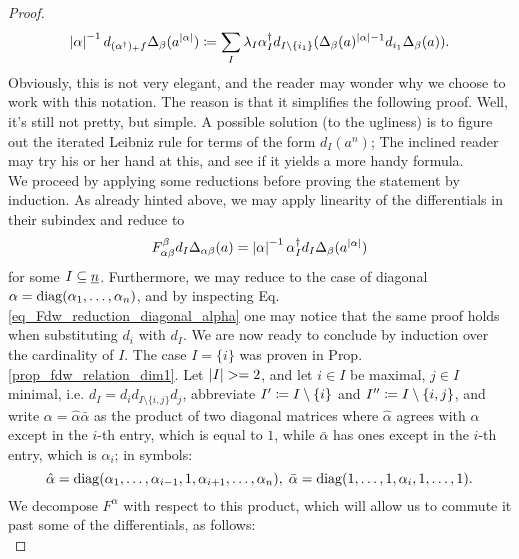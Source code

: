 \begin{cor}
\begin{proof}
\begin{equation*}
    \abs{\alpha}^{-1} d_{(\alpha^\dagger)_+ f} \Delta_{\beta}(a^{\abs{\alpha}}) \defas %
    \sum_I \lambda_I \alpha^\dagger_I d_{I \setminus \{i_1\}}
      (\Delta_{\beta}(a)^{\abs{\alpha}-1} d_{i_1} \Delta_{\beta}(a)).
  \end{equation*}
  Obviously, this is not very elegant, and the reader may wonder why we choose to work with this notation. The reason is that it simplifies the following proof. Well, it's still not pretty, but simple. A possible solution (to the ugliness) is to figure out the iterated Leibniz rule for terms of the form $d_I (a^n)$; The inclined reader may try his or her hand at this, and see if it yields a more handy formula. \\
  We proceed by applying some reductions before proving the statement by induction. As already hinted above, we may apply linearity of the differentials in their subindex and reduce to
  \begin{equation*}
    F_{\alpha\beta}^\beta d_I \Delta_{\alpha\beta} (a) =%
    \abs{\alpha}^{-1}\alpha^\dagger_I d_I \Delta_{\beta}(a^{\abs{\alpha}})%
  \end{equation*}
  for some $I \subseteq \underline{n}$. Furthermore, we may reduce to the case of diagonal $\alpha = \mathrm{diag}(\alpha_1, \ldots, \alpha_n)$, and by inspecting Eq. \ref{eq_Fdw_reduction_diagonal_alpha} one may notice that the same proof holds when substituting $d_i$ with $d_I$. We are now ready to conclude by induction over the cardinality of $I$. The case $I = \{i\}$ was proven in Prop. \ref{prop_fdw_relation_dim1}. Let $\left\vert I\right\vert >= 2$, and let $i \in I$ be maximal, $j\in I$ minimal, i.e. $d_I = d_i d_{I \setminus \{i,j\}} d_j$, abbreviate $I^\prime \coloneqq I \setminus \{i\}$ and $I^{\prime\prime} \coloneqq I \setminus \{i,j\}$, and write $\alpha = \hat \alpha \bar \alpha$ as the product of two diagonal matrices where $\hat \alpha$ agrees with $\alpha$ except in the $i$-th entry, which is equal to $1$, while $\bar \alpha$ has ones except in the $i$-th entry, which is $\alpha_i$; in symbols:
  \begin{equation*}
    \hat \alpha = \diag(\alpha_1, \ldots, \alpha_{i-1}, 1, \alpha_{i+1}, \ldots, \alpha_n),\;%
      \bar \alpha = \diag(1,\ldots,1,\alpha_i,1,\ldots,1).
  \end{equation*}
  We decompose $F^\alpha$ with respect to this product, which will allow us to commute it past some of the differentials, as follows:\\

\end{proof}
\end{cor}
